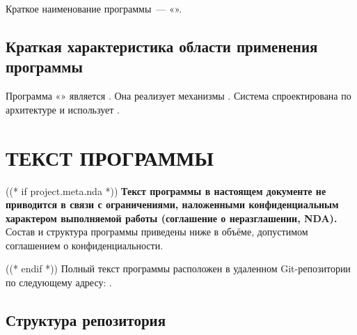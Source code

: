 \documentclass[12pt,a4paper]{extarticle}
\begin{document}
Краткое наименование программы~--- «\hseProjectNameShort».

\subsection{Краткая характеристика области применения программы}

Программа «\projectname» является . Она реализует механизмы . Система спроектирована по  архитектуре и использует .

\clearpage

\section{ТЕКСТ ПРОГРАММЫ}

((* if project.meta.nda *))
\textbf{Текст программы в настоящем документе не приводится в связи с
ограничениями, наложенными конфиденциальным характером выполняемой работы
(соглашение о неразглашении, NDA).} Состав и структура программы приведены
ниже в объёме, допустимом соглашением о конфиденциальности.

((* endif *))
Полный текст программы расположен в удаленном Git-репозитории по следующему адресу: . 

\subsection{Структура репозитория}
\end{document}
